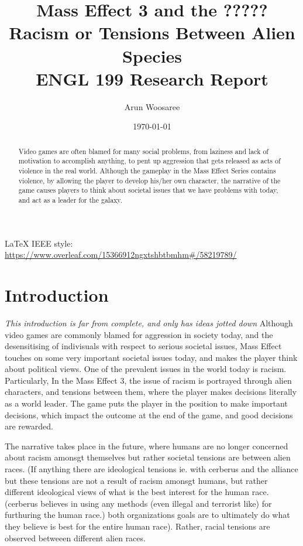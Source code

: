 \documentclass[journal]{IEEEtran}
\title{Mass Effect 3 and the ????? Racism or Tensions Between Alien Species\\
\vspace{.25cm}\large ENGL 199 Research Report \vspace{-.5cm}}
\author{\LARGE Arun Woosaree}
\date{\today}
\begin{document}
\maketitle %

\begin{abstract}
 Video games are often blamed for many social problems, from laziness and lack of motivation to accomplish anything, to pent up aggression that gets released as acts of violence in the real world. Although the gameplay in the Mass Effect Series contains violence, by allowing the player to develop his/her own character, the narrative of the game causes players to think about societal issues that we have problems with today, and act as a leader for the galaxy.
\end{abstract}

\LaTeX{} IEEE style:
\url{https://www.overleaf.com/15366912ngxtshbtbmhm#/58219789/}
\section{Introduction}
\textit{This introduction is far from complete, and only has ideas jotted down}
Although video games are commonly blamed for aggression in society today,
and the desensitising of indivisuals with respect to serious societal issues, Mass Effect  touches on some very important societal issues today, and
makes the player think about political views. One of the prevalent issues in the world today is
racism. Particularly, In the Mass Effect 3, the issue of racism is portrayed through alien characters, and
tensions between them, where the player makes decisions literally as a world leader. The game puts the player in the position to
make important decisions, which impact the outcome at the end of the game, and good decisions are rewarded.

The narrative takes place in the future, where humans are no longer concerned about racism amonsgt themselves but rather societal
tensions are between alien races. (If anything there are ideological tensions ie. with cerberus and the alliance but these
tensions are not a result of racism amonsgt humans, but rather different ideological views of what is the best interest for the human race. (cerberus believes in using any methods (even illegal and terrorist like) for furthuring the human race.)
both organizations goals are to ultimately do what they believe is best for the entire human race). Rather, racial tensions are observed betweeen different alien races.
\end{document}
